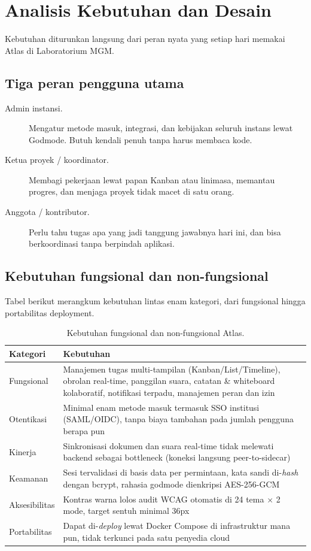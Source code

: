 \section{Analisis Kebutuhan dan Desain}

Kebutuhan diturunkan langsung dari peran nyata yang setiap hari memakai Atlas di Laboratorium MGM.

\subsection{Tiga peran pengguna utama}

\begin{description}
\item[Admin instansi.] Mengatur metode masuk, integrasi, dan kebijakan seluruh instans lewat Godmode. Butuh kendali penuh tanpa harus membaca kode.
\item[Ketua proyek / koordinator.] Membagi pekerjaan lewat papan Kanban atau linimasa, memantau progres, dan menjaga proyek tidak macet di satu orang.
\item[Anggota / kontributor.] Perlu tahu tugas apa yang jadi tanggung jawabnya hari ini, dan bisa berkoordinasi tanpa berpindah aplikasi.
\end{description}

\subsection{Kebutuhan fungsional dan non-fungsional}

Tabel berikut merangkum kebutuhan lintas enam kategori, dari fungsional hingga portabilitas deployment.

\begin{table}[t]
\centering
\caption{Kebutuhan fungsional dan non-fungsional Atlas.}
\label{tab:kebutuhan}
\small
\begin{tabular}{@{}L{3.2cm}L{13cm}@{}}
\toprule
\textbf{Kategori} & \textbf{Kebutuhan} \\
\midrule
Fungsional & Manajemen tugas multi-tampilan (Kanban/List/Timeline), obrolan real-time, panggilan suara, catatan \& whiteboard kolaboratif, notifikasi terpadu, manajemen peran dan izin \\
Otentikasi & Minimal enam metode masuk termasuk SSO institusi (SAML/OIDC), tanpa biaya tambahan pada jumlah pengguna berapa pun \\
Kinerja & Sinkronisasi dokumen dan suara real-time tidak melewati backend sebagai bottleneck (koneksi langsung peer-to-sidecar) \\
Keamanan & Sesi tervalidasi di basis data per permintaan, kata sandi di-\textit{hash} dengan bcrypt, rahasia godmode dienkripsi AES-256-GCM \\
Aksesibilitas & Kontras warna lolos audit WCAG otomatis di 24 tema $\times$ 2 mode, target sentuh minimal 36px \\
Portabilitas & Dapat di-\textit{deploy} lewat Docker Compose di infrastruktur mana pun, tidak terkunci pada satu penyedia cloud \\
\bottomrule
\end{tabular}
\end{table}

